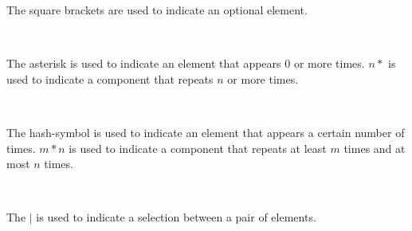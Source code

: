 The square brackets are used to indicate an optional element.
\begin{bnf*}
\\
\end{bnf*}

The asterisk is used to indicate an element that appears 0 or more times. $n*$ is used to indicate a component that repeats $n$ or more times.
\begin{bnf*}
\\
\end{bnf*}

The hash-symbol is used to indicate an element that appears a certain number of times. $m*n$ is used to indicate a component that repeats at least $m$ times and at most $n$ times.
\begin{bnf*}
\\
\end{bnf*}

The $|$ is used to indicate a selection between a pair of elements.
\begin{bnf*}
\\
\end{bnf*}
